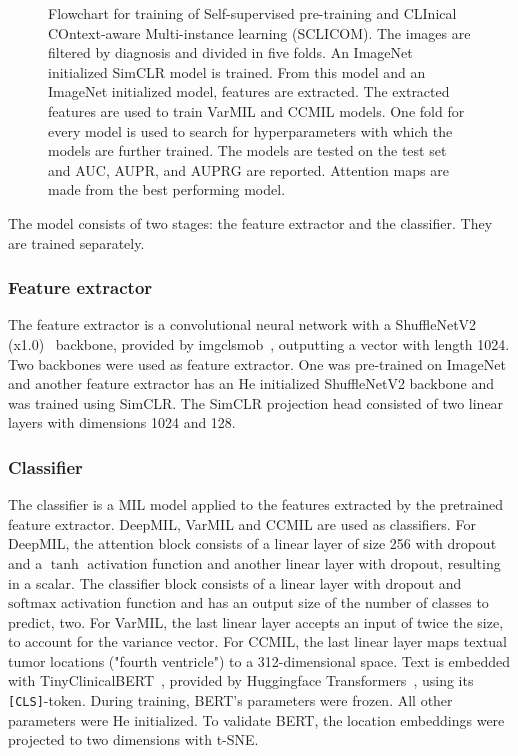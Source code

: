 \begin{figure}
    \caption[Flowchart of training SCLICOM.]{
        Flowchart for training of Self-supervised pre-training and CLInical COntext-aware Multi-instance learning (SCLICOM).
        The images are filtered by diagnosis and divided in five folds.
        An ImageNet initialized SimCLR model is trained.
        From this model and an ImageNet initialized model, features are extracted.
        The extracted features are used to train VarMIL and CCMIL models.
        One fold for every model is used to search for hyperparameters with which the models are further trained.
        The models are tested on the test set and AUC, AUPR, and AUPRG are reported.
        Attention maps are made from the best performing model.
    }
    \label{fig:flowchart-sclicom}
\end{figure}

The model consists of two stages: the feature extractor and the classifier.
They are trained separately.

\subsubsection{Feature extractor}
The feature extractor is a convolutional neural network with a {ShuffleNetV2} (x1.0)~ backbone, provided by imgclsmob~, outputting a vector with length 1024.
Two backbones were used as feature extractor.
One was pre-trained on ImageNet and another feature extractor has an He initialized ShuffleNetV2 backbone and was trained using SimCLR.
The SimCLR projection head consisted of two linear layers with dimensions 1024 and 128.

\subsubsection{Classifier}
The classifier is a MIL model applied to the features extracted by the pretrained feature extractor.
DeepMIL, VarMIL and CCMIL are used as classifiers.
For DeepMIL, the attention block consists of a linear layer of size 256 with dropout and a $\tanh$ activation function and another linear layer with dropout, resulting in a scalar.
The classifier block consists of a linear layer with dropout and $\mathrm{softmax}$ activation function and has an output size of the number of classes to predict, \ie two.
For VarMIL, the last linear layer accepts an input of twice the size, to account for the variance vector.
For CCMIL, the last linear layer maps textual tumor locations (\eg "fourth ventricle") to a 312-dimensional space.
Text is embedded with TinyClinicalBERT~, provided by Huggingface Transformers~, using its \texttt{[CLS]}-token.
During training, BERT's parameters were frozen.
All other parameters were He initialized.
To validate BERT, the location embeddings were projected to two dimensions with t-SNE.

